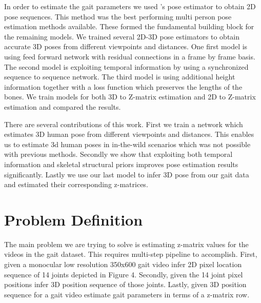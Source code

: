 In order to estimate the gait parameters we used \parencite{cao2016realtime}'s pose estimator to obtain 2D pose sequences. This method was the best performing multi person pose estimation methods available. These formed the fundamental building block for the remaining models. We trained several 2D-3D pose estimators to obtain accurate 3D poses from different viewpoints and distances. One first model is using feed forward network with residual connections in a frame by frame basis. The second model is exploiting temporal information by using a synchronized sequence to sequence network. The third model is using additional height information together with a loss function which preserves the lengths of the bones. We train models for both 3D to Z-matrix estimation and 2D to Z-matrix estimation and compared the results.

There are several contributions of this work. First we train a network which estimates 3D human pose from different viewpoints and distances. This enables us to estimate 3d human poses in in-the-wild  scenarios which was not possible with previous methods. Secondly we show that exploiting both  temporal information and skeletal structural priors improves pose estimation results significantly. Lastly we use our last model to infer 3D pose from our gait data and estimated their corresponding z-matrices.

\section{Problem Definition}

The main problem we are trying to solve is estimating z-matrix values for the videos in the gait dataset. This requires multi-step pipeline to accomplish. First, given a monocular low resolution 350x600 gait video infer 2D pixel location sequence of 14 joints depicted in Figure 4. Secondly, given the 14 joint pixel positions infer 3D position sequence of those joints. Lastly, given 3D position sequence for a gait video estimate gait parameters in terms of a z-matrix row.

